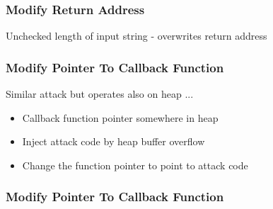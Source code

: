 \documentclass{beamer}
\begin{document}
\begin{frame}
	\frametitle{Modify Return Address}
	Unchecked length of input string - overwrites return address
	\begin{figure}[!h]
\begin{center}
\end{center}
\end{figure}

\end{frame}

\begin{frame}
	\frametitle{Modify Pointer To Callback Function}
	Similar attack but operates also on heap ...
	\begin{itemize}
		\item Callback function pointer somewhere in heap
		\item Inject attack code by heap buffer overflow
		\item Change the function pointer to point to attack code
	\end{itemize}
\end{frame}

\begin{frame}
	\frametitle{Modify Pointer To Callback Function}
	\begin{figure}[!h]
\begin{center}
\end{center}
\end{figure}

\end{frame}
\end{document}
